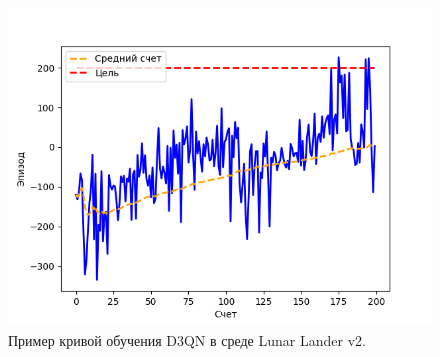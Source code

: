 \begin{figure}
	\centering
	\includegraphics[width=\textwidth]{figures/d3qn_train_score}
	\caption{Пример кривой обучения D3QN в среде Lunar Lander v2.}
	\label{fig:trainScore}
\end{figure}


